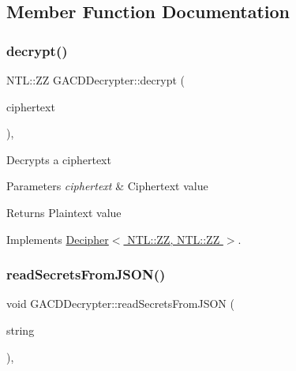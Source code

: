 \subsection{Member Function Documentation}
\mbox{\label{classGACDDecrypter_a92f6afd3d0a43dd5538cf6a83398ee33}} 
\subsubsection{\texorpdfstring{decrypt()}{decrypt()}}
{\footnotesize\ttfamily N\+T\+L\+::\+ZZ G\+A\+C\+D\+Decrypter\+::decrypt (\begin{DoxyParamCaption}\item[{N\+T\+L\+::\+ZZ \&}]{ciphertext }\end{DoxyParamCaption})\hspace{0.3cm}{\ttfamily [override]}, {\ttfamily [virtual]}}

Decrypts a ciphertext 
\begin{DoxyParams}{Parameters}
{\em ciphertext} & Ciphertext value \\
\hline
\end{DoxyParams}
\begin{DoxyReturn}{Returns}
Plaintext value 
\end{DoxyReturn}


Implements \hyperlink{classDecipher_ac6b8c369eda2d7e17fa90cb594cf41b6}{Decipher$<$ N\+T\+L\+::\+Z\+Z, N\+T\+L\+::\+Z\+Z $>$}.

\mbox{\label{classGACDDecrypter_a7634cc069e61c1a3cf2443fed7c2b15f}} 
\subsubsection{\texorpdfstring{read\+Secrets\+From\+J\+S\+O\+N()}{readSecretsFromJSON()}}
{\footnotesize\ttfamily void G\+A\+C\+D\+Decrypter\+::read\+Secrets\+From\+J\+S\+ON (\begin{DoxyParamCaption}\item[{std\+::string \&}]{string }\end{DoxyParamCaption})\hspace{0.3cm}{\ttfamily [override]}, {\ttfamily [virtual]}}

